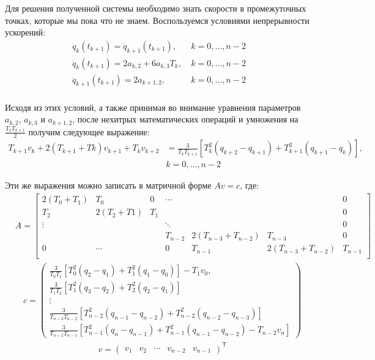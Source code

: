 Для решения полученной системы необходимо знать скорости в промежуточных точках, которые мы пока что не знаем. Воспользуемся условиями непрерывности ускорений:
\begin{align*}
	\ddot{q}_{k}(t_{k+1}) = \ddot{q}_{k+1}(t_{k+1}),		&\		k=0,\dotsc,n-2\\
	\ddot{q}_{k}(t_{k+1}) = 2a_{k,2} + 6a_{k,3}T_{k},		&\		k=0,\dotsc,n-2\\
	\ddot{q}_{k+1}(t_{k+1}) = 2a_{k+1,2},					&\		k=0,\dotsc,n-2\\
\end{align*}

Исходя из этих условий, а также принимая во внимание уравнения параметров $a_{k,2}$, $a_{k,3}$ и $a_{k+1,2}$, после нехитрых математических операций и умножения на $\frac{T_{k}T_{k+1}}{2}$ получим следующее выражение:
\begin{align*}
	T_{k+1}v_{k} + 2(T_{k+1}+T{k})v_{k+1} + T_{k}v_{k+2} &= \frac{3}{T_{k}T_{k+1}}[T_{k}^{2}(q_{k+2} - q_{k+1}) + T_{k+1}^{2}(q_{k+1} - q_{k})],\\
	&k=0,\dotsc,n-2
\end{align*}

Эти же выражения можно записать в матричной форме $Av = c$, где:
\begin{align*}
	&A = 
	\begin{bmatrix}
		2(T_{0} + T_{1})	&	T_{0}			&		0	&	\dotsm	&							&						&	0\\
		T_{2}				&	2(T_{2} + T{1})	&	T_{1}	&			&							&						&	0\\
		\vdots				&					&			& 	\ddots	&							&						&	0\\
							&					&			&	T_{n-2}	&	2(T_{n-3} + T_{n-2})	&	T_{n-3}				&	0\\
		0					&			\dotsm	&			&		0	&	T_{n-1}					& 2(T_{n-3} + T_{n-2})	&	T_{n-1}\\
	\end{bmatrix}
\end{align*}
\begin{align*}
	&c =
	\begin{pmatrix}
		\frac{3}{T_{0}T_{1}}[T_{0}^{2}(q_{2} - q_{1}) + T_{1}^{2}(q_{1} - q_{0})] - T_{1}v_{0},\\
		\frac{3}{T_{1}T_{2}}[T_{1}^{2}(q_{3} - q_{2}) + T_{2}^{2}(q_{2} - q_{1})]\\
		\vdots	\\
		\frac{3}{T_{n-3}T_{n-2}}[T_{n-2}^{2}(q_{n-1} - q_{n-2}) + T_{n-2}^{2}(q_{n-2} - q_{n-3})]\\
		\frac{3}{T_{n-2}T_{n-1}}[T_{n-1}^{2}(q_{n} - q_{n-1}) + T_{n-1}^{2}(q_{n-1} - q_{n-2}) - T_{n-2}v_{n}] 
	\end{pmatrix}
\end{align*}
\begin{align*}
	&v =
	\begin{pmatrix}
		v_{1}	&	v_{2}	&	\dotsm	&	v_{n-2}	&	v_{n-1}
	\end{pmatrix}^\mathsf{T}
\end{align*}

